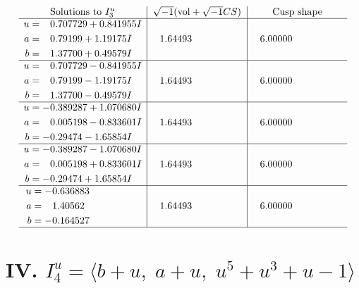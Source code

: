 \documentclass[1p]{elsarticle_modified}
\theoremstyle{definition}
\newcommand{\I}{\sqrt{-1}}
\begin{document}
$$\begin{array}{c|c|c}  
\text{Solutions to }I^u_{3}& \I (\text{vol} + \sqrt{-1}CS) & \text{Cusp shape}\\
 \hline 
\begin{aligned}
u &= \phantom{-}0.707729 + 0.841955 I \\
a &= \phantom{-}0.79199 + 1.19175 I \\
b &= \phantom{-}1.37700 + 0.49579 I\end{aligned}
 & \phantom{-}1.64493\phantom{ +0.000000I} & \phantom{-}6.00000\phantom{ +0.000000I} \\ \hline\begin{aligned}
u &= \phantom{-}0.707729 - 0.841955 I \\
a &= \phantom{-}0.79199 - 1.19175 I \\
b &= \phantom{-}1.37700 - 0.49579 I\end{aligned}
 & \phantom{-}1.64493\phantom{ +0.000000I} & \phantom{-}6.00000\phantom{ +0.000000I} \\ \hline\begin{aligned}
u &= -0.389287 + 1.070680 I \\
a &= \phantom{-}0.005198 - 0.833601 I \\
b &= -0.29474 - 1.65854 I\end{aligned}
 & \phantom{-}1.64493\phantom{ +0.000000I} & \phantom{-}6.00000\phantom{ +0.000000I} \\ \hline\begin{aligned}
u &= -0.389287 - 1.070680 I \\
a &= \phantom{-}0.005198 + 0.833601 I \\
b &= -0.29474 + 1.65854 I\end{aligned}
 & \phantom{-}1.64493\phantom{ +0.000000I} & \phantom{-}6.00000\phantom{ +0.000000I} \\ \hline\begin{aligned}
u &= -0.636883\phantom{ +0.000000I} \\
a &= \phantom{-}1.40562\phantom{ +0.000000I} \\
b &= -0.164527\phantom{ +0.000000I}\end{aligned}
 & \phantom{-}1.64493\phantom{ +0.000000I} & \phantom{-}6.00000\phantom{ +0.000000I}\\
 \hline 
 \end{array}$$\newpage\newpage\renewcommand{\arraystretch}{1}
\centering \section*{IV. $I^u_{4}= \langle b+u,\;a+u,\;u^5+u^3+u-1 \rangle$}
\end{document}
